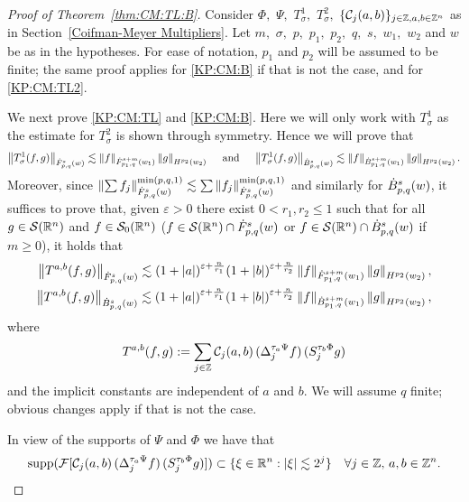 \begin{proof}[Proof of Theorem~\ref{thm:CM:TL:B}] Consider $\Phi,$ $\Psi,$ $T_\sigma^1,$ $T_\sigma^2,$ $\{\C_j(a,b)\}_{j\in\ent,a,b\in\ent^n}$ as in Section~\ref{Coifman-Meyer Multipliers}. Let $m,$ $\sigma,$ $p,$ $p_1,$ $p_2,$ $q,$ $s,$ $w_1,$ $w_2$ and $w$ be as in the hypotheses.  
For ease of notation, $p_1$ and $p_2$ will be assumed to be finite; the same proof applies for \eqref{KP:CM:B} if that is not the case, and for \eqref{KP:CM:TL2}.


We next prove \eqref{KP:CM:TL} and \eqref{KP:CM:B}. Here we will only work with $T_\sigma^1$ as the estimate for $T_\sigma^2$ is shown through symmetry. Hence we will prove that 
 \begin{align*}
 \norm{T^{1}_\sigma(f,g)}{\dot{F}^s_{p,q}(w)} \lesssim  \norm{f}{\dot{F}^{s+m}_{p_1, q}(w_1)} \norm{g}{H^{p_2}(w_2)}\quad  \text{ and }\quad 
 \norm{T^1_\sigma(f,g)}{\dot{B}^s_{p,q}(w)} \lesssim  \norm{f}{\dot{B}^{s+m}_{p_1, q}(w_1)} \norm{g}{H^{p_2}(w_2)}.
\end{align*}
  Moreover, since $\norm{\sum f_j}{\tlw{p}{s}{q}{w}}^{\min(p,q,1)}\lesssim \sum\norm{f_j}{\tlw{p}{s}{q}{w}}^{\min(p,q,1)}$  and similarly for $\besw{p}{s}{q}{w}$, it suffices to prove that, given $\varepsilon>0$ there exist $0<r_1,r_2\le 1$  such that for all $g\in \sw$ and  $f\in \swz$ ($f\in \sw\cap \tlw{p}{s}{q}{w}$ or  $f\in \sw\cap \besw{p}{s}{q}{w}$ if $m\ge 0$),  it holds that
\begin{align}
 \norm{T^{a,b}(f,g)}{\dot{F}^s_{p,q}(w)} \lesssim (1+\abs{a})^{\varepsilon+\frac{n}{r_1}}  (1+\abs{b})^{\varepsilon+\frac{n}{r_2}} \norm{f}{\dot{F}^{s+m}_{p_1, q}(w_1)} \norm{g}{H^{p_2}(w_2)}\label{eq:estbbTL},\\
 \norm{T^{a,b}(f,g)}{\dot{B}^s_{p,q}(w)} \lesssim (1+\abs{a})^{\varepsilon+\frac{n}{r_1}}  (1+\abs{b})^{\varepsilon+\frac{n}{r_2}} \norm{f}{\dot{B}^{s+m}_{p_1, q}(w_1)} \norm{g}{H^{p_2}(w_2)}\label{eq:estbbB},
\end{align}
where
\[
T^{a,b}(f,g):=\sum_{j\in\ent} \C_j(a,b) \,(\Do{ \tau_a \Psi }{j} f)\, (\So{ \tau_b \Phi }{j} g )
\]
and the implicit constants are independent of $a$ and $b.$  We will assume $q$ finite; obvious changes apply if that is not the case.

In view of the supports of $\Psi$ and $\Phi$ we have that 
\begin{equation*}
\supp (\mathcal{F}[\C_j(a,b) \,(\Do{ \tau_a \Psi }{j} f ) \, ( \So{ \tau_b \Phi }{j} g )])  \subset \{\xi \in \rn: |\xi| \lesssim 2^j \} \quad \forall j \in \ent,\,a,b\in \ent^n.
\end{equation*}


\end{proof}
